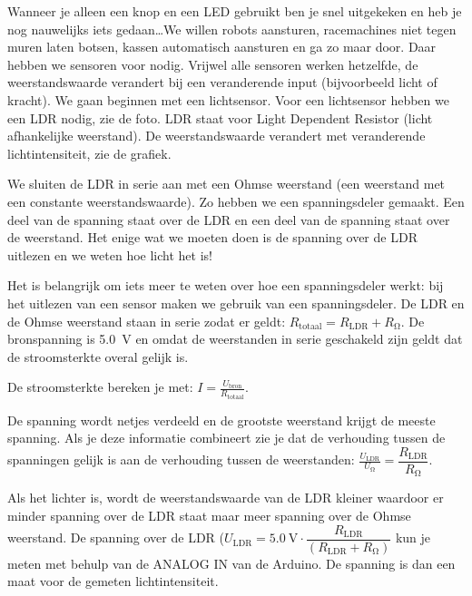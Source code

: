 \documentclass{arduino}
\begin{document}


Wanneer je alleen een knop en een LED gebruikt ben je snel uitgekeken en heb je nog nauwelijks iets gedaan\dots We willen robots aansturen, racemachines niet tegen muren laten botsen, kassen automatisch aansturen en ga zo maar door. Daar hebben we sensoren voor nodig. Vrijwel alle sensoren werken hetzelfde, de weerstandswaarde verandert bij een veranderende input (bijvoorbeeld licht of kracht). We gaan beginnen met een lichtsensor. Voor een lichtsensor hebben we een LDR nodig, zie de foto. LDR staat voor Light Dependent Resistor (licht afhankelijke weerstand). De weerstandswaarde verandert met veranderende lichtintensiteit, zie de grafiek.


We sluiten de LDR in serie aan met een Ohmse weerstand (een weerstand met een constante weerstandswaarde). Zo hebben we een spanningsdeler gemaakt. Een deel van de spanning staat over de LDR en een deel van de spanning staat over de weerstand. Het enige wat we moeten doen is de spanning over de LDR uitlezen en we weten hoe licht het is!

Het is belangrijk om iets meer te weten over hoe een spanningsdeler werkt: bij het uitlezen van een sensor maken we gebruik van een spanningsdeler. De LDR en de Ohmse weerstand staan in serie zodat er geldt: $R_\mathrm{totaal} = R_\mathrm{LDR} + R_{\si{\ohm}}$. De bronspanning is \SI{5.0}{\volt} en omdat de weerstanden in serie geschakeld zijn geldt dat de stroomsterkte overal gelijk is.

De stroomsterkte bereken je met: $I = \frac{U_\mathrm{bron}}{R_\mathrm{totaal}}$. 

De spanning wordt netjes verdeeld en de grootste weerstand krijgt de meeste spanning. Als je deze informatie combineert zie je dat de verhouding tussen de spanningen gelijk is aan de verhouding tussen de weerstanden: $\frac{U_\mathrm{LDR}}{U_{\si{\ohm}}} = \dfrac{R_\mathrm{LDR}}{R_{\si{\ohm}}}$.


Als het lichter is, wordt de weerstandswaarde van de LDR kleiner waardoor er minder spanning over de LDR staat maar meer spanning over de Ohmse weerstand. De spanning over de LDR ($U_\mathrm{LDR} = \SI{5.0}{\volt} \cdot \dfrac{R_\mathrm{LDR}}{(R_\mathrm{LDR} + R_{\si{\ohm}})}$ kun je meten met behulp van de ANALOG IN van de Arduino. De spanning is dan een maat voor de gemeten lichtintensiteit. 
\end{document}
